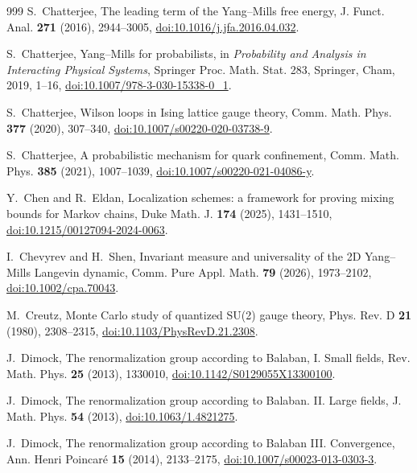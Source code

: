 \documentclass[aps,prd,twocolumn,superscriptaddress,nofootinbib,longbibliography,floatfix,amsmath,amssymb,10pt]{revtex4-2}
\theoremstyle{definition}
\theoremstyle{remark}
\begin{document}
\begin{thebibliography}{999}
S.~Chatterjee, The leading term of the Yang--Mills free energy, J. Funct.
Anal. \textbf{271} (2016), 2944--3005,
\href{https://doi.org/10.1016/j.jfa.2016.04.032}{doi:10.1016/j.jfa.2016.04.032}.

S.~Chatterjee, Yang--Mills for probabilists, in \emph{Probability and
Analysis in Interacting Physical Systems}, Springer Proc. Math. Stat. 283,
Springer, Cham, 2019, 1--16,
\href{https://doi.org/10.1007/978-3-030-15338-0_1}{doi:10.1007/978-3-030-15338-0\_1}.

S.~Chatterjee, Wilson loops in Ising lattice gauge theory, Comm. Math.
Phys. \textbf{377} (2020), 307--340,
\href{https://doi.org/10.1007/s00220-020-03738-9}{doi:10.1007/s00220-020-03738-9}.

S.~Chatterjee, A probabilistic mechanism for quark confinement, Comm. Math.
Phys. \textbf{385} (2021), 1007--1039,
\href{https://doi.org/10.1007/s00220-021-04086-y}{doi:10.1007/s00220-021-04086-y}.

Y.~Chen and R.~Eldan, Localization schemes: a framework for proving mixing
bounds for Markov chains, Duke Math. J. \textbf{174} (2025), 1431--1510,
\href{https://doi.org/10.1215/00127094-2024-0063}{doi:10.1215/00127094-2024-0063}.

I.~Chevyrev and H.~Shen, Invariant measure and universality of the 2D
Yang--Mills Langevin dynamic, Comm. Pure Appl. Math. \textbf{79} (2026),
1973--2102, \href{https://doi.org/10.1002/cpa.70043}{doi:10.1002/cpa.70043}.

M.~Creutz, Monte Carlo study of quantized SU(2) gauge theory, Phys. Rev. D
\textbf{21} (1980), 2308--2315,
\href{https://doi.org/10.1103/PhysRevD.21.2308}{doi:10.1103/PhysRevD.21.2308}.

J.~Dimock, The renormalization group according to Balaban, I. Small fields,
Rev. Math. Phys. \textbf{25} (2013), 1330010,
\href{https://doi.org/10.1142/S0129055X13300100}{doi:10.1142/S0129055X13300100}.

J.~Dimock, The renormalization group according to Balaban. II. Large fields,
J. Math. Phys. \textbf{54} (2013),
\href{https://doi.org/10.1063/1.4821275}{doi:10.1063/1.4821275}.

J.~Dimock, The renormalization group according to Balaban III. Convergence,
Ann. Henri Poincar\'e \textbf{15} (2014), 2133--2175,
\href{https://doi.org/10.1007/s00023-013-0303-3}{doi:10.1007/s00023-013-0303-3}.


\end{thebibliography}
\end{document}
